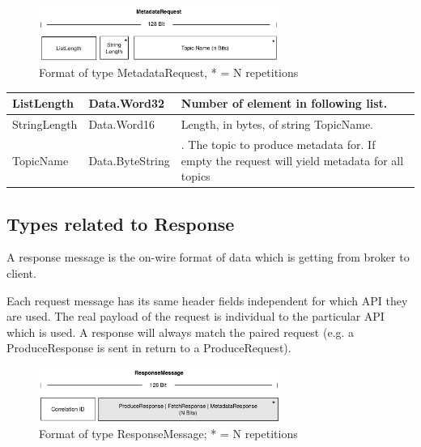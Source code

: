 \begin{figure}[H]
    \centering
    \includegraphics[width=0.7\textwidth]{images/impl-prot-types-metadataRequest.png}
    \caption{Format of type MetadataRequest, * = N repetitions}
    \label{fig:impl-prot-types-ftPartition}
\end{figure}

\begin{table}[H]
\centering
\begin{tabular}{ l  l  p{10cm} }
\hline
ListLength    & Data.Word32 & Number of element in following list.                                                                                             \\ \hline
StringLength      & Data.Word16     & Length, in bytes, of string TopicName.              \\ \hline
TopicName         & Data.ByteString & . The topic to produce metadata for. If
empty the request will yield metadata for all topics  \\ \hline
\end{tabular}
\end{table}

\subsection{Types related to Response}
A response message is the on-wire format of data which is getting from broker to
client.

Each request message has its same header fields independent for which API they are used. 
The real payload of the request is individual to the particular API which is
used. A response will always match the paired request (e.g. a ProduceResponse is
sent in return to a ProduceRequest).

\begin{figure}[H]
    \centering
    \includegraphics[width=0.7\textwidth]{images/impl-prot-types-responseMessage.png}
    \caption{Format of type ResponseMessage; * = N repetitions}
    \label{fig:impl-prot-types-responseMessage}
\end{figure}

